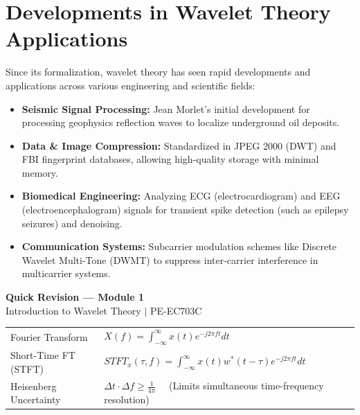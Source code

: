 \documentclass[12pt,a4paper]{article}
\renewcommand{\arraystretch}{1.45}
\begin{document}
\section{Developments in Wavelet Theory Applications}

Since its formalization, wavelet theory has seen rapid developments and applications across various engineering and scientific fields:
\begin{itemize}[leftmargin=*, itemsep=4pt]
  \item \textbf{Seismic Signal Processing:} Jean Morlet's initial development for processing geophysics reflection waves to localize underground oil deposits.
  \item \textbf{Data \& Image Compression:} Standardized in JPEG 2000 (DWT) and FBI fingerprint databases, allowing high-quality storage with minimal memory.
  \item \textbf{Biomedical Engineering:} Analyzing ECG (electrocardiogram) and EEG (electroencephalogram) signals for transient spike detection (such as epilepsy seizures) and denoising.
  \item \textbf{Communication Systems:} Subcarrier modulation schemes like Discrete Wavelet Multi-Tone (DWMT) to suppress inter-carrier interference in multicarrier systems.
\end{itemize}

\newpage
\begin{center}
  {\large\bfseries\color{myred} Quick Revision --- Module 1}\\[3pt]
  {\small\color{mydark} Introduction to Wavelet Theory $|$ PE-EC703C}
\end{center}
\noindent{\color{myred}\rule{\linewidth}{1.2pt}}
\vspace{4pt}

\begin{tcolorbox}[formulabox, title={\textbf{Key Time-Frequency Equations}}]
\renewcommand{\arraystretch}{1.35}
\begin{tabularx}{\linewidth}{B{5.0cm} X}
Fourier Transform & $X(f) = \int_{-\infty}^{\infty} x(t) e^{-j 2\pi f t} dt$ \\[4pt]
Short-Time FT (STFT) & $STFT_x(\tau, f) = \int_{-\infty}^{\infty} x(t) w^*(t - \tau) e^{-j 2\pi f t} dt$ \\[4pt]
Heisenberg Uncertainty & $\Delta t \cdot \Delta f \ge \frac{1}{4\pi} \quad$ (Limits simultaneous time-frequency resolution)
\end{tabularx}
\end{tcolorbox}
\end{document}
